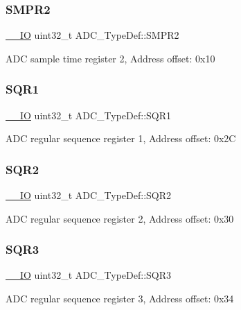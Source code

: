 \subsubsection{\texorpdfstring{SMPR2}{SMPR2}}
{\footnotesize\ttfamily \mbox{\hyperlink{core__sc300_8h_aec43007d9998a0a0e01faede4133d6be}{\+\_\+\+\_\+\+IO}} uint32\+\_\+t A\+D\+C\+\_\+\+Type\+Def\+::\+S\+M\+P\+R2}

A\+DC sample time register 2, Address offset\+: 0x10 \mbox{\label{struct_a_d_c___type_def_a0185aa54962ba987f192154fb7a2d673}} 
\subsubsection{\texorpdfstring{SQR1}{SQR1}}
{\footnotesize\ttfamily \mbox{\hyperlink{core__sc300_8h_aec43007d9998a0a0e01faede4133d6be}{\+\_\+\+\_\+\+IO}} uint32\+\_\+t A\+D\+C\+\_\+\+Type\+Def\+::\+S\+Q\+R1}

A\+DC regular sequence register 1, Address offset\+: 0x2C \mbox{\label{struct_a_d_c___type_def_a6b6e55e6c667042e5a46a76518b73d5a}} 
\subsubsection{\texorpdfstring{SQR2}{SQR2}}
{\footnotesize\ttfamily \mbox{\hyperlink{core__sc300_8h_aec43007d9998a0a0e01faede4133d6be}{\+\_\+\+\_\+\+IO}} uint32\+\_\+t A\+D\+C\+\_\+\+Type\+Def\+::\+S\+Q\+R2}

A\+DC regular sequence register 2, Address offset\+: 0x30 \mbox{\label{struct_a_d_c___type_def_a51dbdba74c4d3559157392109af68fc6}} 
\subsubsection{\texorpdfstring{SQR3}{SQR3}}
{\footnotesize\ttfamily \mbox{\hyperlink{core__sc300_8h_aec43007d9998a0a0e01faede4133d6be}{\+\_\+\+\_\+\+IO}} uint32\+\_\+t A\+D\+C\+\_\+\+Type\+Def\+::\+S\+Q\+R3}

A\+DC regular sequence register 3, Address offset\+: 0x34 \mbox{\label{struct_a_d_c___type_def_a9745df96e98f3cdc2d05ccefce681f64}} 
